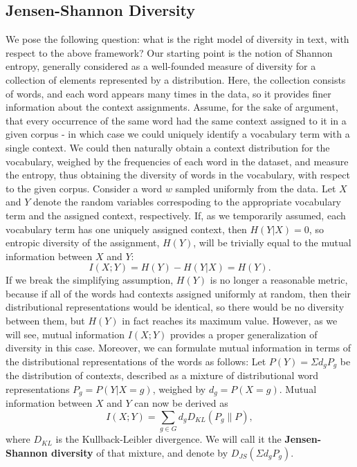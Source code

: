 \subsection{Jensen-Shannon Diversity}
\label{sec:jensen-shannon-divergence}
We pose the following question: what is the right model of diversity
in text, with respect to the above framework? %
Our starting point is the notion of Shannon 
entropy, generally considered as a well-founded measure of diversity 
for a collection of elements represented by a
distribution. Here, the collection consists of words, and each word
appears many times in the data, so it provides
finer information about the context assignments. Assume, for the sake
of argument, that every occurrence of the same word had the same
context assigned to it in a given corpus - in which case we could 
uniquely identify a vocabulary term with a single context. We could then naturally obtain a
context distribution for the vocabulary, weighed by the frequencies of
each word in the dataset, and measure the entropy, thus obtaining the
diversity of words in the vocabulary, with respect to the given corpus. Consider a word $w$
sampled uniformly from the data. Let $X$ and $Y$ denote the random
variables correspoding to the 
appropriate vocabulary term and the assigned context,
respectively. If, as we temporarily assumed,
each vocabulary term has one uniquely assigned context, then $H(Y|X)=0$, so entropic diversity of the
assignment, $H(Y)$, will be trivially equal to the mutual information between $X$
and $Y$: 
\[I(X;Y) = H(Y) - H(Y|X) =H(Y).\]
If we break the simplifying assumption, $H(Y)$ is no longer a
reasonable metric, because if all of the words had contexts assigned
uniformly at random, then their distributional representations would be
identical, so there would be no diversity between them, but $H(Y)$
in fact reaches its maximum value. However, as we will see, mutual
information $I(X;Y)$ provides a proper generalization of diversity in
this case. Moreover, we can formulate mutual information in terms of the
distributional representations of the words as follows:
\bed\label{jsd-definition}
Let $P(Y)=\Sigma d_g P_g$ be the distribution of contexts,
described as a mixture of distributional word representations
$P_g=P(Y|X=g)$, weighed by $d_g=P(X=g)$. Mutual information between
$X$ and $Y$ can now be derived as
\[ I(X;Y)= \sum_{g\in G} d_g D_{KL}(P_g\|P),\]
where $D_{KL}$ is the Kullback-Leibler divergence.
We will call it the {\bf Jensen-Shannon diversity} of that
mixture, and denote by $D_{JS}(\Sigma d_gP_g)$.
\eed


